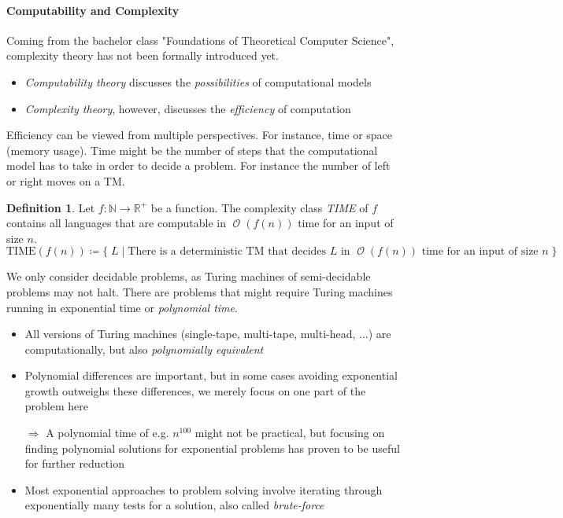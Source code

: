 \documentclass[10pt,fleqn]{article}
\theoremstyle{definition}
\newtheorem{definition}{Definition}
\theoremstyle{remark}
\DeclareMathOperator{\onot}{\mathcal{O}}
\begin{document}
\paragraph{Computability and Complexity} Coming from the bachelor class "Foundations of Theoretical Computer Science", complexity theory has not been formally introduced yet.
\begin{itemize}
    \item \emph{Computability theory} discusses the \emph{possibilities} of computational models
    \item \emph{Complexity theory}, however, discusses the \emph{efficiency} of computation
\end{itemize}
Efficiency can be viewed from multiple perspectives. For instance, time or space (memory usage). Time might be the number of steps that the computational model has to take in order to decide a problem. For instance the number of left or right moves on a TM.
\begin{definition}
    Let \(f\colon \mathbb{N} \rightarrow \mathbb{R}^+\) be a function. The complexity class \emph{TIME} of \(f\) contains all languages that are computable in \(\onot{(f(n))}\) time for an input of size \(n\).
    \[
        \text{TIME}(f(n)) \coloneqq \{ \; L \mid \text{There is a deterministic TM that decides } L \text{ in } \onot{(f(n))} \text{ time for an input of size } n \; \}
    \]
\end{definition}
We only consider decidable problems, as Turing machines of semi-decidable problems may not halt. There are problems that might require Turing machines running in exponential time or \emph{polynomial time}.
\begin{itemize}
    \item All versions of Turing machines (single-tape, multi-tape, multi-head, ...) are computationally, but also \emph{polynomially equivalent}
    \item Polynomial differences are important, but in some cases avoiding exponential growth outweighs these differences, we merely focus on one part of the problem here
    \item[\(\Rightarrow\)] A polynomial time of e.g. \(n^{100}\) might not be practical, but focusing on finding polynomial solutions for exponential problems has proven to be useful for further reduction
    \item Most exponential approaches to problem solving involve iterating through exponentially many tests for a solution, also called \emph{brute-force}
\end{itemize}
\end{document}

